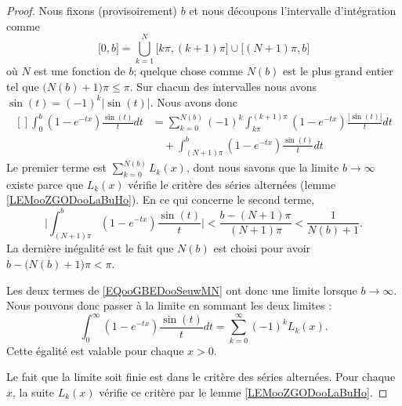 \begin{proof}
    Nous fixons (provisoirement) \( b\) et nous découpons l'intervalle d'intégration comme
    \begin{equation}
        \mathopen[ 0 , b \mathclose]=\bigcup_{k=1}^N\mathopen[ k\pi , (k+1)\pi \mathclose]\cup\mathopen\big[ (N+1)\pi  , b \mathclose\big]
    \end{equation}
    où \( N\) est une fonction de \( b\); quelque chose comme \( N(b)\) est le plus grand entier tel que \(\big( N(b)+1 \big)\pi\leq \pi\). Sur chacun des intervalles nous avons \( \sin(t)=(-1)^k| \sin(t) |\). Nous avons donc
    \begin{equation}       \label{EQooGBEDooSeuwMN}
        \begin{aligned}[]
            \int_0^b(1- e^{-tx})\frac{ \sin(t) }{ t }dt&=\sum_{k=0}^{N(b)}(-1)^k\int_{k\pi}^{(k+1)\pi}(1- e^{-tx})\frac{ | \sin(t) | }{ t }dt\\
                &\quad+\int_{(N+1)\pi}^b(1- e^{-tx})\frac{ \sin(t) }{ t }dt
        \end{aligned}
    \end{equation}
    Le premier terme est \( \sum_{k=0}^{N(b)}L_k(x)\), dont nous savons que la limite \( b\to \infty\) existe parce que \( L_k(x)\) vérifie le critère des séries alternées (lemme \ref{LEMooZGODooLaBuHo}). En ce qui concerne le second terme,
    \begin{equation}
        \big|\int_{(N+1)\pi}^b (1- e^{-tx})\frac{ \sin(t) }{ t }\big| <  \frac{  b-( N+1 )\pi    }{ ( N+1 )\pi }<\frac{1}{ N(b)+1 }.
    \end{equation}
    La dernière inégalité est le fait que \( N(b)\) est choisi pour avoir \( b-\big( N(b)+1 \big)\pi<\pi\).

            Les deux termes de \eqref{EQooGBEDooSeuwMN} ont donc une limite lorsque \( b\to \infty\). Nous pouvons donc passer à la limite en sommant les deux limites :
            \begin{equation}
                \int_0^{\infty}(1- e^{-tx})\frac{ \sin(t) }{ t }dt=\sum_{k=0}^{\infty}(-1)^kL_k(x).
            \end{equation}
            Cette égalité est valable pour chaque \( x>0\). 
            
            Le fait que la limite soit finie est dans le critère des séries alternées. Pour chaque \( x\), la suite \( L_k(x)\) vérifie ce critère par le lemme \ref{LEMooZGODooLaBuHo}.
\end{proof}

